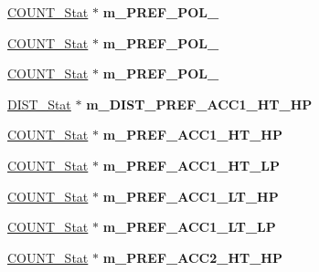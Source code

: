 \begin{DoxyCompactItemize}
\item 
\hypertarget{classall__stats__c_af729175d92e352282bf1645f5b582327}{
\hyperlink{classCOUNT__Stat}{COUNT\_\-Stat} $\ast$ {\bfseries m\_\-PREF\_\-POL\_}}
\label{classall__stats__c_af729175d92e352282bf1645f5b582327}

\item 
\hypertarget{classall__stats__c_a0fc01550c33cae6add5791b3056902b4}{
\hyperlink{classCOUNT__Stat}{COUNT\_\-Stat} $\ast$ {\bfseries m\_\-PREF\_\-POL\_}}
\label{classall__stats__c_a0fc01550c33cae6add5791b3056902b4}

\item 
\hypertarget{classall__stats__c_abbe3e4c1793f82dfb3d89539e4b62bc0}{
\hyperlink{classCOUNT__Stat}{COUNT\_\-Stat} $\ast$ {\bfseries m\_\-PREF\_\-POL\_}}
\label{classall__stats__c_abbe3e4c1793f82dfb3d89539e4b62bc0}

\item 
\hypertarget{classall__stats__c_a23fbe956d5a23c9713ac6032bf8bd7b2}{
\hyperlink{classDIST__Stat}{DIST\_\-Stat} $\ast$ {\bfseries m\_\-DIST\_\-PREF\_\-ACC1\_\-HT\_\-HP}}
\label{classall__stats__c_a23fbe956d5a23c9713ac6032bf8bd7b2}

\item 
\hypertarget{classall__stats__c_ad5726f7f004e5734a81b0d7b1b7470d5}{
\hyperlink{classCOUNT__Stat}{COUNT\_\-Stat} $\ast$ {\bfseries m\_\-PREF\_\-ACC1\_\-HT\_\-HP}}
\label{classall__stats__c_ad5726f7f004e5734a81b0d7b1b7470d5}

\item 
\hypertarget{classall__stats__c_abedc1a2fadc016e80d05ae88d52db85a}{
\hyperlink{classCOUNT__Stat}{COUNT\_\-Stat} $\ast$ {\bfseries m\_\-PREF\_\-ACC1\_\-HT\_\-LP}}
\label{classall__stats__c_abedc1a2fadc016e80d05ae88d52db85a}

\item 
\hypertarget{classall__stats__c_ab73403263a3e8d1d6a7220306ec99efb}{
\hyperlink{classCOUNT__Stat}{COUNT\_\-Stat} $\ast$ {\bfseries m\_\-PREF\_\-ACC1\_\-LT\_\-HP}}
\label{classall__stats__c_ab73403263a3e8d1d6a7220306ec99efb}

\item 
\hypertarget{classall__stats__c_ae01b76de8b0121127cff0407dbc2b207}{
\hyperlink{classCOUNT__Stat}{COUNT\_\-Stat} $\ast$ {\bfseries m\_\-PREF\_\-ACC1\_\-LT\_\-LP}}
\label{classall__stats__c_ae01b76de8b0121127cff0407dbc2b207}

\item 
\hypertarget{classall__stats__c_a32e103161703662ec561509dffbb03ef}{
\hyperlink{classCOUNT__Stat}{COUNT\_\-Stat} $\ast$ {\bfseries m\_\-PREF\_\-ACC2\_\-HT\_\-HP}}
\label{classall__stats__c_a32e103161703662ec561509dffbb03ef}


\end{DoxyCompactItemize}
